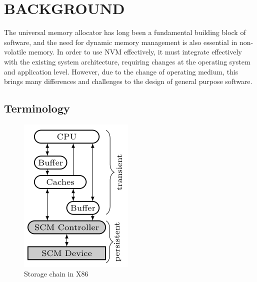 \documentclass[sigconf]{acmart}
\begin{document}
\section{BACKGROUND}
The universal memory allocator has long been a fundamental building block of software, and the need for dynamic memory management is also essential in non-volatile memory. In order to use NVM effectively, it must integrate effectively with the existing system architecture, requiring changes at the operating system and application level. However, due to the change of operating medium, this brings many differences and challenges to the design of general purpose software.

\subsection{Terminology}

\begin{figure}
	\centering
	\includegraphics[width=0.7\linewidth]{"figure 1"}
	\caption{Storage chain in X86}
	\label{fig:figure 1 Storage chain in X86}
\end{figure}
\end{document}
